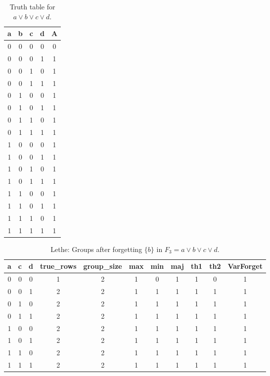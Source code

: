 \begin{table}[!tb]
    \centering
    \begin{tabular}{|c|c|c|c|c|}
        \hline
        \textbf{a} & \textbf{b} & \textbf{c} & \textbf{d} & \textbf{A} \\ \hline
        0 & 0 & 0 & 0 & 0 \\ \hline
        0 & 0 & 0 & 1 & 1 \\ \hline
        0 & 0 & 1 & 0 & 1 \\ \hline
        0 & 0 & 1 & 1 & 1 \\ \hline
        0 & 1 & 0 & 0 & 1 \\ \hline
        0 & 1 & 0 & 1 & 1 \\ \hline
        0 & 1 & 1 & 0 & 1 \\ \hline
        0 & 1 & 1 & 1 & 1 \\ \hline
        1 & 0 & 0 & 0 & 1 \\ \hline
        1 & 0 & 0 & 1 & 1 \\ \hline
        1 & 0 & 1 & 0 & 1 \\ \hline
        1 & 0 & 1 & 1 & 1 \\ \hline
        1 & 1 & 0 & 0 & 1 \\ \hline
        1 & 1 & 0 & 1 & 1 \\ \hline
        1 & 1 & 1 & 0 & 1 \\ \hline
        1 & 1 & 1 & 1 & 1 \\ \hline
    \end{tabular}
    \caption{Truth table for $a \lor b \lor c \lor d$.}
    \label{tab:truthtab}
\end{table}

\begin{table}[!tb]
    \centering
    \begin{tabular}{|c|c|c|c|c|c|c|c|c|c|c|}
        \hline
        \textbf{a} & \textbf{c} & \textbf{d} & \textbf{true\_rows} & \textbf{group\_size} & \textbf{max} & \textbf{min} & \textbf{maj} & \textbf{th1} & \textbf{th2} & \textbf{VarForget} \\ \hline
        \rowcolor{gray!40} 0 & 0 & 0 & 1 & 2 & 1 & 0 & 1 & 1 & 0 & 1 \\ \hline
        \rowcolor{blue!40} 0 & 0 & 1 & 2 & 2 & 1 & 1 & 1 & 1 & 1 & 1 \\ \hline
        \rowcolor{red!40} 0 & 1 & 0 & 2 & 2 & 1 & 1 & 1 & 1 & 1 & 1 \\ \hline
        \rowcolor{green!40} 0 & 1 & 1 & 2 & 2 & 1 & 1 & 1 & 1 & 1 & 1 \\ \hline
        \rowcolor{yellow!40} 1 & 0 & 0 & 2 & 2 & 1 & 1 & 1 & 1 & 1 & 1 \\ \hline
        \rowcolor{gray!40} 1 & 0 & 1 & 2 & 2 & 1 & 1 & 1 & 1 & 1 & 1 \\ \hline
        \rowcolor{blue!40} 1 & 1 & 0 & 2 & 2 & 1 & 1 & 1 & 1 & 1 & 1 \\ \hline
        \rowcolor{red!40} 1 & 1 & 1 & 2 & 2 & 1 & 1 & 1 & 1 & 1 & 1 \\ \hline
    \end{tabular}
    \caption{Lethe: Groups after forgetting $\{b\}$ in $F_{3} = a \lor b \lor c \lor d$.}
    \label{tab:lethe-F3-b-groups}
\end{table}
